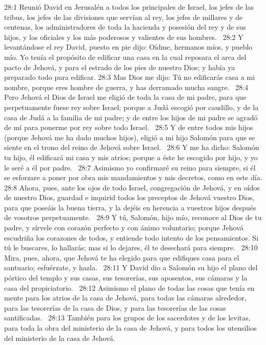 28:1 Reunió David en Jerusalén a todos los principales de Israel, los jefes de las tribus, los jefes de las divisiones que servían al rey, los jefes de millares y de centenas, los administradores de toda la hacienda y posesión del rey y de sus hijos, y los oficiales y los más poderosos y valientes de sus hombres.  
28:2 Y levantándose el rey David, puesto en pie dijo: Oídme, hermanos míos, y pueblo mío. Yo tenía el propósito de edificar una casa en la cual reposara el arca del pacto de Jehová, y para el estrado de los pies de nuestro Dios; y había ya preparado todo para edificar. 
28:3 Mas Dios me dijo: Tú no edificarás casa a mi nombre, porque eres hombre de guerra, y has derramado mucha sangre.  
28:4 Pero Jehová el Dios de Israel me eligió de toda la casa de mi padre, para que perpetuamente fuese rey sobre Israel; porque a Judá escogió por caudillo, y de la casa de Judá a la familia de mi padre; y de entre los hijos de mi padre se agradó de mí para ponerme por rey sobre todo Israel.  
28:5 Y de entre todos mis hijos (porque Jehová me ha dado muchos hijos), eligió a mi hijo Salomón para que se siente en el trono del reino de Jehová sobre Israel.  
28:6 Y me ha dicho: Salomón tu hijo, él edificará mi casa y mis atrios; porque a éste he escogido por hijo, y yo le seré a él por padre.  
28:7 Asimismo yo confirmaré su reino para siempre, si él se esforzare a poner por obra mis mandamientos y mis decretos, como en este día. 
28:8 Ahora, pues, ante los ojos de todo Israel, congregación de Jehová, y en oídos de nuestro Dios, guardad e inquirid todos los preceptos de Jehová vuestro Dios, para que poseáis la buena tierra, y la dejéis en herencia a vuestros hijos después de vosotros perpetuamente.  
28:9 Y tú, Salomón, hijo mío, reconoce al Dios de tu padre, y sírvele con corazón perfecto y con ánimo voluntario; porque Jehová escudriña los corazones de todos, y entiende todo intento de los pensamientos. Si tú le buscares, lo hallarás; mas si lo dejares, él te desechará para siempre.  
28:10 Mira, pues, ahora, que Jehová te ha elegido para que edifiques casa para el santuario; esfuérzate, y hazla.  
28:11 Y David dio a Salomón su hijo el plano del pórtico del templo y sus casas, sus tesorerías, sus aposentos, sus cámaras y la casa del propiciatorio.  
28:12 Asimismo el plano de todas las cosas que tenía en mente para los atrios de la casa de Jehová, para todas las cámaras alrededor, para las tesorerías de la casa de Dios, y para las tesorerías de las cosas santificadas.  
28:13 También para los grupos de los sacerdotes y de los levitas, para toda la obra del ministerio de la casa de Jehová, y para todos los utensilios del ministerio de la casa de Jehová.  
